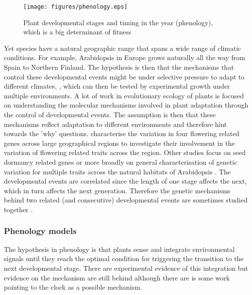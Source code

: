 \begin{figure}[tb]
\centering
\texttt{[image: figures/phenology.eps]}
  \caption{Plant developmental stages and timing in the year (phenology), which
    is a big determinant of fitness}
\label{fig:plantLife}
\end{figure}

Yet species have a natural geographic range that spans a wide range of climatic
conditions. For example, Arabidopsis in Europe grows naturally all the way from
Spain to Northern Finland. The hypothesis is then that the mechanisms that
control these developmental events might be under selective pressure to adapt to
different climates, , which can then be tested by experimental growth under
multiple environments. A lot of work in evolutionary ecology of plants is
focused on understanding the molecular mechanisms involved in plant adaptation
through the control of developmental events. The assumption is then that these
mechanisms reflect adaptation to different environments and therefore hint
towards the 'why' questions. \citet{mendez-vigo_altitudinal_2011} characterise
the variation in four flowering related genes across large geographical regions
to investigate their involvement in the variation of flowering related traits
across the region. Other studies focus on seed dormancy related genes
\citep{chiang_dog1_2011} or more broadly on general characterisation of genetic
variation for multiple traits across the natural habitats of Arabidopsis
\citep{atwell_genome-wide_2010}. The developmental events are correlated since
the length of one stage affects the next, which in turn affects the next
generation. Therefore the genetic mechanisms behind two related (and
consecutive) developmental events are sometimes studied together
\citep{debieu_co-variation_2013}.

\subsubsection*{Phenology models}
The hypothesis in phenology is that plants sense and integrate environmental
signals until they reach the optimal condition for triggering the transition to
the next developmental stage. There are experimental evidence of this
integration but evidence on the mechanism are still behind although there are is
some work pointing to the clock as a possible mechanism.

